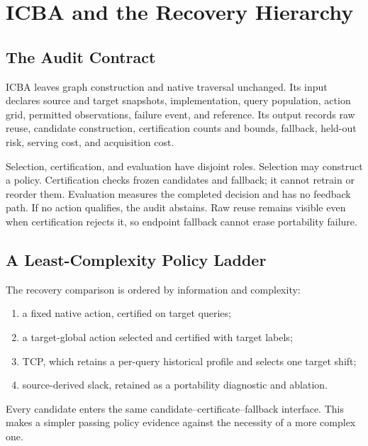 \section{ICBA and the Recovery Hierarchy}
\label{sec:auditor}

\subsection{The Audit Contract}
ICBA leaves graph construction and native traversal unchanged. Its input declares source and target snapshots, implementation, query population, action grid, permitted observations, failure event, and reference. Its output records raw reuse, candidate construction, certification counts and bounds, fallback, held-out risk, serving cost, and acquisition cost.

Selection, certification, and evaluation have disjoint roles. Selection may construct a policy. Certification checks frozen candidates and fallback; it cannot retrain or reorder them. Evaluation measures the completed decision and has no feedback path. If no action qualifies, the audit abstains. Raw reuse remains visible even when certification rejects it, so endpoint fallback cannot erase portability failure.

\subsection{A Least-Complexity Policy Ladder}
The recovery comparison is ordered by information and complexity:
\begin{enumerate}
\item a fixed native action, certified on target queries;
\item a target-global action selected and certified with target labels;
\item TCP, which retains a per-query historical profile and selects one target shift;
\item source-derived slack, retained as a portability diagnostic and ablation.
\end{enumerate}
Every candidate enters the same candidate--certificate--fallback interface. This makes a simpler passing policy evidence against the necessity of a more complex one.


